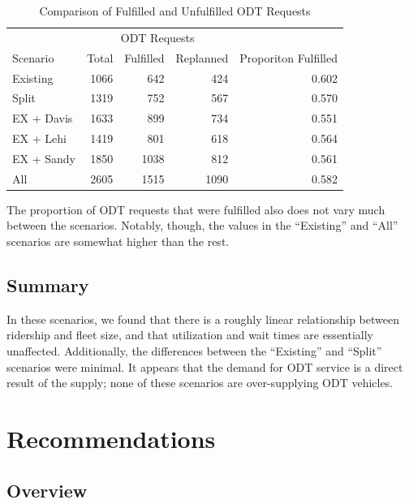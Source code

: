 \documentclass[
]{article}
\begin{document}
\begin{table}

\caption{\label{tab:odt-fulfillment}Comparison of Fulfilled and Unfulfilled ODT Requests}
\centering
\begin{tabular}[t]{lrrrr}
\toprule
\multicolumn{1}{c}{} & \multicolumn{3}{c}{ODT Requests} & \multicolumn{1}{c}{} \\
\cmidrule(l{3pt}r{3pt}){2-4}
Scenario & Total & Fulfilled & Replanned & Proporiton Fulfilled\\
\midrule
Existing & 1066 & 642 & 424 & 0.602\\
Split & 1319 & 752 & 567 & 0.570\\
EX + Davis & 1633 & 899 & 734 & 0.551\\
EX + Lehi & 1419 & 801 & 618 & 0.564\\
EX + Sandy & 1850 & 1038 & 812 & 0.561\\
\addlinespace
All & 2605 & 1515 & 1090 & 0.582\\
\bottomrule
\end{tabular}
\end{table}

The proportion of ODT requests that were fulfilled also does not vary much between the scenarios. Notably, though, the values in the ``Existing'' and ``All'' scenarios are somewhat higher than the rest.

\hypertarget{summary-1}{%
\subsection{Summary}\label{summary-1}}

In these scenarios, we found that there is a roughly linear relationship between ridership and fleet size, and that utilization and wait times are essentially unaffected. Additionally, the differences between the ``Existing'' and ``Split'' scenarios were minimal. It appears that the demand for ODT service is a direct result of the supply; none of these scenarios are over-supplying ODT vehicles.

\hypertarget{recommendations}{%
\section{Recommendations}\label{recommendations}}

\hypertarget{overview-2}{%
\subsection{Overview}\label{overview-2}}
\end{document}
